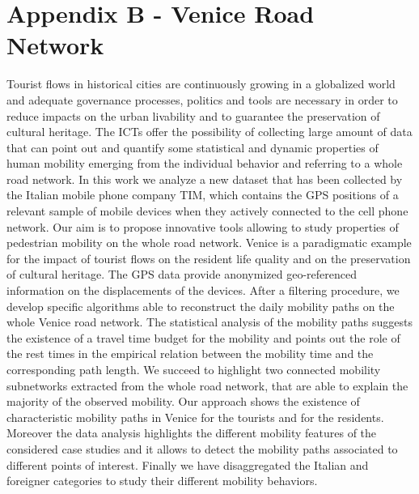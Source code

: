 \documentclass{standalone}
\begin{document}
\chapter*{Appendix B - Venice Road Network}

Tourist flows in historical cities are continuously growing in a globalized world and adequate governance processes, politics and tools are necessary in order to reduce impacts on the urban livability and to guarantee the preservation of cultural heritage.
The ICTs offer the possibility of collecting large amount of data that can point out and quantify some statistical and dynamic properties of human mobility emerging from the individual behavior and referring to a whole road network.
In this work we analyze a new dataset that has been collected by the Italian mobile phone company TIM, which contains the GPS positions of a relevant sample of mobile devices when they actively connected to the cell phone network.
Our aim is to propose innovative tools allowing to study properties of pedestrian mobility on the whole road network.
Venice is a paradigmatic example for the impact of tourist flows on the resident life quality and on the preservation of cultural heritage.
The GPS data provide anonymized geo-referenced information on the displacements of the devices.
After a filtering procedure, we develop specific algorithms able to reconstruct the daily mobility paths on the whole Venice road network.
The statistical analysis of the mobility paths suggests the existence of a travel time budget for the mobility and points out the role of the rest times in the empirical relation between the mobility time and the corresponding path length.
We succeed to highlight two connected mobility subnetworks extracted from the whole road network, that are able to explain the majority of the observed mobility.
Our approach shows the existence of characteristic mobility paths in Venice for the tourists and for the residents.
Moreover the data analysis highlights the different mobility features of the considered case studies and it allows to detect the mobility paths associated to different points of interest.
Finally we have disaggregated the Italian and foreigner categories to study their different mobility behaviors.
\end{document}
